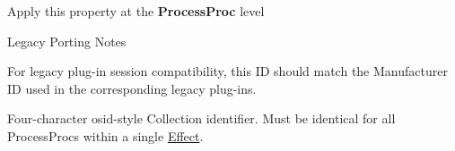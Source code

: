 \begin{Desc}
\begin{description}
\begin{DoxyItemize}
\item Apply this property at the {\bfseries Process\+Proc} level\end{DoxyItemize}
\begin{DoxyRefDesc}{Legacy Porting Notes}
\item[\hyperlink{a00384__porting_notes000041}{Legacy Porting Notes}]For legacy plug-\/in session compatibility, this I\+D should match the Manufacturer I\+D used in the corresponding legacy plug-\/ins. \end{DoxyRefDesc}
\item[{\em 
\hypertarget{a00283_a6571f4e41a5dd06e4067249228e2249ea3a41fcdff5af1a4fd19dcbca7b1ba6f3}{}A\+A\+X\+\_\+e\+Property\+\_\+\+Product\+I\+D\label{a00283_a6571f4e41a5dd06e4067249228e2249ea3a41fcdff5af1a4fd19dcbca7b1ba6f3}
}]Four-\/character osid-\/style Collection identifier. Must be identical for all Process\+Procs within a single \hyperlink{a00096}{Effect}.


\end{description}
\end{Desc}
